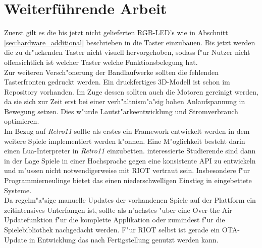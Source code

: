 \documentclass[a4paper]{article}
\begin{document}
\section{Weiterführende Arbeit}
  \label{sec:further}
  Zuerst gilt es die bis jetzt nicht gelieferten RGB-LED's wie in Abschnitt
  \ref{sec:hardware_additional} beschrieben in die Taster einzubauen. Bis jetzt
  werden die zu dr"uckenden Taster nicht visuell hervorgehoben, sodass f"ur
  Nutzer nicht offensichtlich ist welcher Taster welche Funktionsbelegung
  hat.\\ Zur weiteren Versch"onerung der Bandlaufwerke sollten die fehlenden
  Tasterfronten gedruckt werden. Ein druckfertiges 3D-Modell ist schon im
  Repository vorhanden. Im Zuge dessen sollten auch die Motoren gereinigt
  werden, da sie sich zur Zeit erst bei einer verh"altnism"a"sig hohen
  Anlaufspannung in Bewegung setzen. Dies w"urde Lautst"arkeentwicklung und
  Stromverbrauch optimieren.\\ Im Bezug auf \textit{Retro11} sollte als erstes
  ein Framework entwickelt werden in dem weitere Spiele implementiert werden
  k"onnen.  Eine M"oglichkeit besteht darin einen Lua-Interpreter in
  \textit{Retro11} einzubetten. interessierte Studierende sind dann in der Lage
  Spiele in einer Hochsprache gegen eine konsistente API zu entwickeln und
  m"ussen nicht notwendigerweise mit RIOT vertraut sein. Insbesondere f"ur
  Programmierneulinge bietet das einen niederschwelligen Einstieg in
  eingebettete Systeme.\\ Da regelm"a"sige manuelle Updates der vorhandenen
  Spiele auf der Plattform ein zeitintensives Unterfangen ist, sollte als
  n"achstes "uber eine Over-the-Air Updatefunktion f"ur die komplette
  Applikation oder zumindest f"ur die Spielebibliothek nachgedacht werden. F"ur
  RIOT selbst ist gerade ein OTA-Update in Entwicklung das nach Fertigstellung
  genutzt werden kann.\\\\

  \printbibliography
\end{document}
